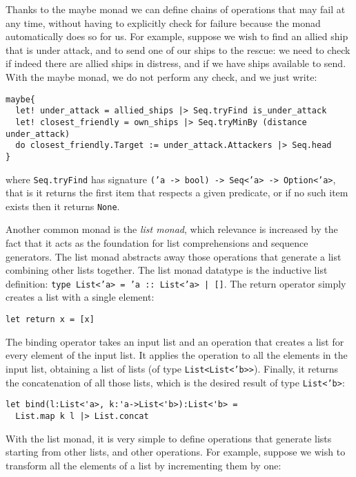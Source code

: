 Thanks to the maybe monad we can define chains of operations that may fail at any time, without having to explicitly check for failure because the monad automatically does so for us. For example, suppose we wish to find an allied ship that is under attack, and to send one of our ships to the rescue: we need to check if indeed there are allied ships in distress, and if we have ships available to send. With the maybe monad, we do not perform any check, and we just write:

\begin{lstlisting}
maybe{
  let! under_attack = allied_ships |> Seq.tryFind is_under_attack
  let! closest_friendly = own_ships |> Seq.tryMinBy (distance under_attack)
  do closest_friendly.Target := under_attack.Attackers |> Seq.head
}
\end{lstlisting}

where \texttt{Seq.tryFind} has signature \texttt{('a -> bool) -> Seq<'a> -> Option<'a>}, that is it returns the first item that respects a given predicate, or if no such item exists then it returns \texttt{None}.

Another common monad is the \textit{list monad}, which relevance is increased by the fact that it acts as the foundation for list comprehensions and sequence generators. The list monad abstracts away those operations that generate a list combining other lists together. The list monad datatype is the inductive list definition: \texttt{type List<'a> = 'a :: List<'a> | []}. The return operator simply creates a list with a single element:

\begin{lstlisting}
let return x = [x]
\end{lstlisting}

The binding operator takes an input list and an operation that creates a list for every element of the input list. It applies the operation to all the elements in the input list, obtaining a list of lists (of type \texttt{List<List<'b>}\texttt{>}). Finally, it returns the concatenation of all those lists, which is the desired result of type \texttt{List<'b>}:

\begin{lstlisting}
let bind(l:List<'a>, k:'a->List<'b>):List<'b> =
  List.map k l |> List.concat
\end{lstlisting}

With the list monad, it is very simple to define operations that generate lists starting from other lists, and other operations. For example, suppose we wish to transform all the elements of a list by incrementing them by one:

